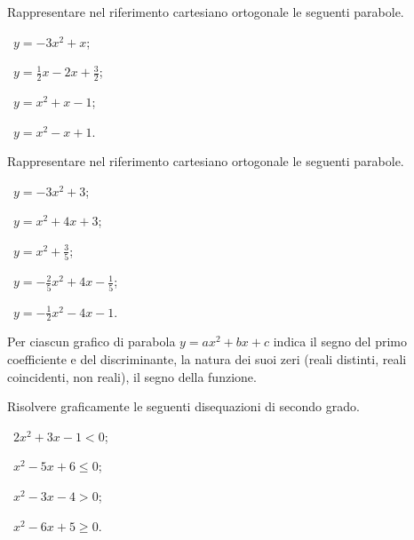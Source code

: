 \begin{esercizio}
 \label{ese:4.7}
Rappresentare nel riferimento cartesiano ortogonale le seguenti parabole.
\begin{multicols}{2}
 \begin{enumeratea}
 \item~$ y=-3x^2+x $;
 \item~$ y=\frac 1 2x-2x+\frac 3 2 $;
 \item~$ y=x^2+x-1 $;
 \item~$ y=x^2-x+1 $.
 \end{enumeratea}
 \end{multicols}
\end{esercizio}

\begin{esercizio}
 \label{ese:4.8}
Rappresentare nel riferimento cartesiano ortogonale le seguenti parabole.
\begin{multicols}{2}
 \begin{enumeratea}
 \item~$ y=-3x^2+3 $;
 \item~$ y=x^2+4x+3 $;
 \item~$ y=x^2+\frac 3 5 $;
 \item~$ y=-\frac 2 5x^2+4x-\frac 1 5 $;
 \item~$ y=-\frac 1 2 x^2-4x-1 $.
 \end{enumeratea}
 \end{multicols}
\end{esercizio}

\begin{esercizio}
 \label{ese:4.9}
Per ciascun grafico di parabola $y=ax^2+bx+c$ indica il segno del primo coefficiente e del discriminante, la natura dei suoi zeri (reali distinti, reali coincidenti, non reali), il segno della funzione.
\begin{center}
 
\end{center}
\end{esercizio}

\begin{esercizio}
 \label{ese:4.10}
Risolvere graficamente le seguenti disequazioni di secondo grado.
\begin{multicols}{2}
 \begin{enumeratea}
 \item~$ 2x^2+3x-1<0 $;
 \item~$ x^2-5x+6\le 0 $;
 \item~$ x^2-3x-4>0 $;
 \item~$ x^2-6x+5\ge 0 $.
 \end{enumeratea}
 \end{multicols}
\end{esercizio}


